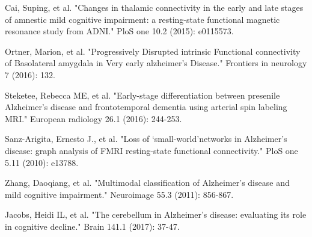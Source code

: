 \documentclass[preprint,12pt]{elsarticle}
\begin{document}
\begin{thebibliography}{1}
		Cai, Suping, et al. "Changes in thalamic connectivity in the early and late stages of amnestic mild cognitive impairment: a resting-state functional magnetic resonance study from ADNI." PloS one 10.2 (2015): e0115573.
		
		Ortner, Marion, et al. "Progressively Disrupted intrinsic Functional connectivity of Basolateral amygdala in Very early alzheimer’s Disease." Frontiers in neurology 7 (2016): 132.
		
		Steketee, Rebecca ME, et al. "Early-stage differentiation between presenile Alzheimer’s disease and frontotemporal dementia using arterial spin labeling MRI." European radiology 26.1 (2016): 244-253.
		
		Sanz-Arigita, Ernesto J., et al. "Loss of ‘small-world’networks in Alzheimer's disease: graph analysis of FMRI resting-state functional connectivity." PloS one 5.11 (2010): e13788.
		
		Zhang, Daoqiang, et al. "Multimodal classification of Alzheimer's disease and mild cognitive impairment." Neuroimage 55.3 (2011): 856-867.
		
		
	Jacobs, Heidi IL, et al. "The cerebellum in Alzheimer’s disease: evaluating its role in cognitive decline." Brain 141.1 (2017): 37-47.	
		
		
		
		
		
	
		
		
		
		
		
		
		
		
		
		
		
		
		
	\end{thebibliography}
	
\end{document}
